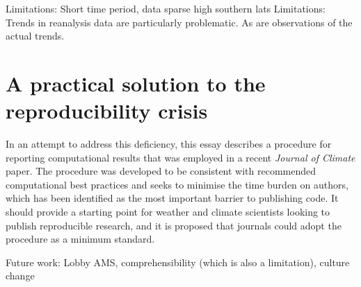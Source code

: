 Limitations: Short time period, data sparse high southern lats
Limitations: Trends in reanalysis data are particularly problematic. As are observations of the actual trends.


\section{A practical solution to the reproducibility crisis}

In an attempt to address this deficiency, this essay describes a procedure for reporting computational results that was employed in a recent \textit{Journal of Climate} paper. The procedure was developed to be consistent with recommended computational best practices and seeks to minimise the time burden on authors, which has been identified as the most important barrier to publishing code. It should provide a starting point for weather and climate scientists looking to publish reproducible research, and it is proposed that journals could adopt the procedure as a minimum standard.

Future work: Lobby AMS, comprehensibility (which is also a limitation), culture change



